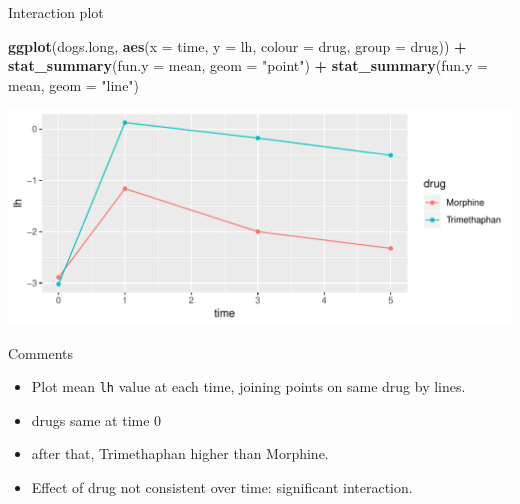 \documentclass[ignorenonframetext,]{beamer}
\newenvironment{Shaded}{\begin{snugshade}}{\end{snugshade}}
\newcommand{\DataTypeTok}[1]{\textcolor[rgb]{0.13,0.29,0.53}{#1}}
\newcommand{\KeywordTok}[1]{\textcolor[rgb]{0.13,0.29,0.53}{\textbf{#1}}}
\newcommand{\NormalTok}[1]{#1}
\newcommand{\OperatorTok}[1]{\textcolor[rgb]{0.81,0.36,0.00}{\textbf{#1}}}
\newcommand{\StringTok}[1]{\textcolor[rgb]{0.31,0.60,0.02}{#1}}
\begin{document}
\begin{frame}[fragile]{Interaction plot}
\protect\hypertarget{interaction-plot-3}{}

\small

\begin{Shaded}
\begin{Highlighting}[]
\KeywordTok{ggplot}\NormalTok{(dogs.long, }\KeywordTok{aes}\NormalTok{(}\DataTypeTok{x =}\NormalTok{ time, }\DataTypeTok{y =}\NormalTok{ lh, }
                      \DataTypeTok{colour =}\NormalTok{ drug, }\DataTypeTok{group =}\NormalTok{ drug)) }\OperatorTok{+}
\StringTok{  }\KeywordTok{stat_summary}\NormalTok{(}\DataTypeTok{fun.y =}\NormalTok{ mean, }\DataTypeTok{geom =} \StringTok{"point"}\NormalTok{) }\OperatorTok{+}
\StringTok{  }\KeywordTok{stat_summary}\NormalTok{(}\DataTypeTok{fun.y =}\NormalTok{ mean, }\DataTypeTok{geom =} \StringTok{"line"}\NormalTok{)}
\end{Highlighting}
\end{Shaded}

\includegraphics{figure/unnamed-chunk-250-1.pdf} \normalsize

\end{frame}

\begin{frame}[fragile]{Comments}
\protect\hypertarget{comments-20}{}

\begin{itemize}
\item
  Plot mean \texttt{lh} value at each time, joining points on same drug
  by lines.
\item
  drugs same at time 0
\item
  after that, Trimethaphan higher than Morphine.
\item
  Effect of drug not consistent over time: significant interaction.
\end{itemize}

\end{frame}
\end{document}
